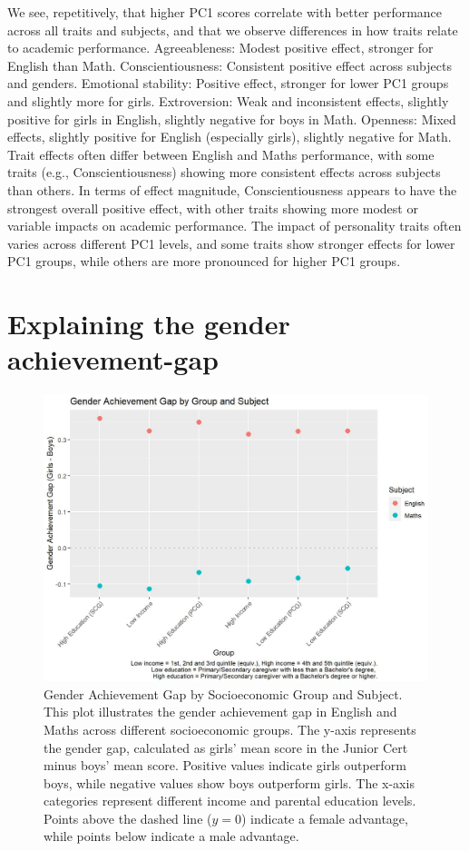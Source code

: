 \documentclass[12pt,a4paper,onecolumn]{article}
\numberwithin{equation}{section}
\begin{document}
We see, repetitively, that higher PC1 scores correlate with better performance across all traits and subjects, and that we observe differences in how traits relate to academic performance. Agreeableness: Modest positive effect, stronger for English than Math. Conscientiousness: Consistent positive effect across subjects and genders. Emotional stability: Positive effect, stronger for lower PC1 groups and slightly more for girls.
Extroversion: Weak and inconsistent effects, slightly positive for girls in English, slightly negative for boys in Math. Openness: Mixed effects, slightly positive for English (especially girls), slightly negative for Math. Trait effects often differ between English and Maths performance, with some traits (e.g., Conscientiousness) showing more consistent effects across subjects than others. In terms of effect magnitude, Conscientiousness appears to have the strongest overall positive effect, with other traits showing more modest or variable impacts on academic performance. The impact of personality traits often varies across different PC1 levels, and some traits show stronger effects for lower PC1 groups, while others are more pronounced for higher PC1 groups.

\section{Explaining the gender achievement-gap}

\begin{figure}[ht] 
    \centering
    \includegraphics[width=1\linewidth]{Gender_gap_by_group.JPG}
    \caption{Gender Achievement Gap by Socioeconomic Group and Subject. This plot illustrates the gender achievement gap in English and Maths across different socioeconomic groups. The y-axis represents the gender gap, calculated as girls' mean score in the Junior Cert minus boys' mean score. Positive values indicate girls outperform boys, while negative values show boys outperform girls. The x-axis categories represent different income and parental education levels. Points above the dashed line ($y=0$) indicate a female advantage, while points below indicate a male advantage.}
    \label{fig:OBDecompGroup}
\end{figure}
\end{document}

